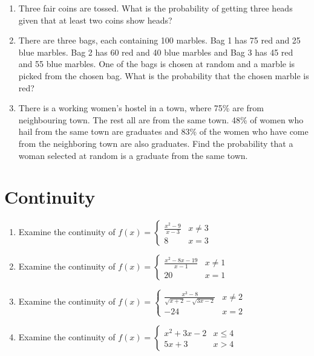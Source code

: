 \documentclass[14pt]{article}
\begin{document}
\begin{multicols}{2}
\begin{enumerate}[resume]
\item 	Three fair coins are tossed. What is the
probability of getting three heads given that
at least two coins show heads?

\item There are three bags, each containing 100
marbles. Bag 1 has 75 red and 25 blue
marbles. Bag 2 has 60 red and 40 blue marbles
and Bag 3 has 45 red and 55 blue marbles.
One of the bags is chosen at random and a
marble is picked from the chosen bag. What
is the probability that the chosen marble is
red?

\item There is a working women's hostel in a
town, where 75\% are from neighbouring
town. The rest all are from the same town.
48\% of women who hail from the same
town are graduates and 83\% of the women
who have come from the neighboring town
are also graduates. Find the probability that
a woman selected at random is a graduate
from the same town.

\end{enumerate} 

\section{Continuity}
\noindent
\begin{enumerate}[resume]


\item Examine the continuity of
$f(x) =  \begin{cases} 
       \frac{x^2 - 9}{x -3} & x\neq 3 \\
        8                            &  x = 3 
   \end{cases}$


\item Examine the continuity of
$f(x) =  \begin{cases} 
       \frac{x^2 - 8x - 19}{x-1} & x\neq 1 \\
        20                           &  x = 1 
   \end{cases}$
   
   
  \item Examine the continuity of
$f(x) =  \begin{cases} 
       \frac{x^3 - 8}{\sqrt{x+2} - \sqrt{3x-2}} & x\neq 2 \\
        -24                            &  x = 2 
   \end{cases}$

\item Examine the continuity of
$f(x) =  \begin{cases} 
        x^2+3x-2 & x\leq 4 \\
        5x+3                           &  x > 4
   \end{cases}$


\end{enumerate}
\end{multicols}
\end{document}
